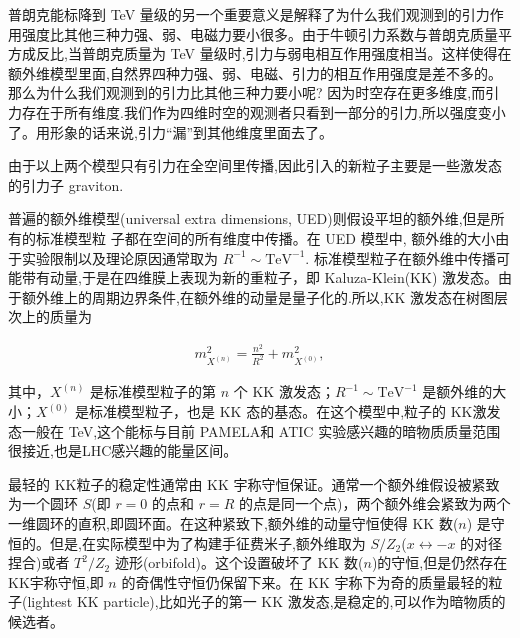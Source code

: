 普朗克能标降到 TeV 量级的另一个重要意义是解释了为什么我们观测到的引力作用强度比其他三种力强、弱、电磁力要小很多。由于牛顿引力系数与普朗克质量平方成反比,当普朗克质量为 TeV 量级时,引力与弱电相互作用强度相当。这样使得在额外维模型里面,自然界四种力强、弱、电磁、引力的相互作用强度是差不多的。那么为什么我们观测到的引力比其他三种力要小呢? 因为时空存在更多维度,而引力存在于所有维度.我们作为四维时空的观测者只看到一部分的引力,所以强度变小了。用形象的话来说,引力“漏”到其他维度里面去了。

由于以上两个模型只有引力在全空间里传播,因此引入的新粒子主要是一些激发态的引力子 graviton.

普遍的额外维模型(universal extra dimensions,
UED)则假设平坦的额外维,但是所有的标准模型粒
子都在空间的所有维度中传播。在 UED 模型中,
额外维的大小由于实验限制以及理论原因通常取为 $R^{-1} \sim \mathrm{TeV}^{-1} .$ 标准模型粒子在额外维中传播可能带有动量,于是在四维膜上表现为新的重粒子，即 Kaluza-Klein(KK) 激发态。由于额外维上的周期边界条件,在额外维的动量是量子化的.所以,KK 激发态在树图层次上的质量为

\begin{align}
m_{X^{(n)}}^2
=\frac{n^2 }{R^2 } + m_{X^{(0)}}^2,
\end{align}

其中，$X^{(n)} $ 是标准模型粒子的第 $n$ 个 KK 激发态；$R^{-1}\sim \mathrm{TeV}^{-1} $ 是额外维的大小；$X^{(0)}$ 是标准模型粒子，也是 KK 态的基态。在这个模型中,粒子的 KK激发态一般在 TeV,这个能标与目前 PAMELA和 ATIC 实验感兴趣的暗物质质量范围很接近,也是LHC感兴趣的能量区间。

最轻的 KK粒子的稳定性通常由 KK 宇称守恒保证。通常一个额外维假设被紧致为一个圆环 $S$(即 $r=0$ 的点和 $r=R$ 的点是同一个点)，两个额外维会紧致为两个一维圆环的直积,即圆环面。在这种紧致下,额外维的动量守恒使得 KK 数($n$) 是守恒的。但是,在实际模型中为了构建手征费米子,额外维取为 $S/Z_2$($x\leftrightarrow -x$ 的对径捏合)或者 $T^2/Z_2$ 迹形(orbifold)。这个设置破坏了 KK 数($n$)的守恒,但是仍然存在 KK宇称守恒,即 $n$ 的奇偶性守恒仍保留下来。在 KK 宇称下为奇的质量最轻的粒子(lightest KK particle),比如光子的第一 KK 激发态,是稳定的,可以作为暗物质的候选者。

\newpage